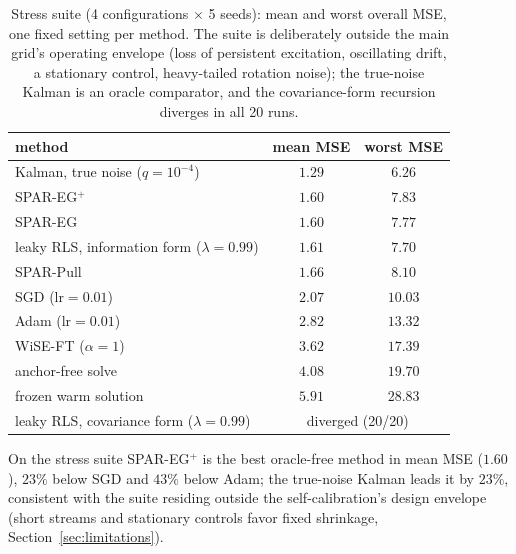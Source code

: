 \documentclass[11pt]{article}
\begin{document}
\begin{table}[htbp]
\centering
\small
\caption{Stress suite (4 configurations $\times$ 5 seeds): mean and worst overall MSE, one fixed setting per method. The suite is deliberately outside the main grid's operating envelope (loss of persistent excitation, oscillating drift, a stationary control, heavy-tailed rotation noise); the true-noise Kalman is an oracle comparator, and the covariance-form recursion diverges in all 20 runs.}
\label{tab:stress}
\begin{tabular}{lcc}
\toprule
method & mean MSE & worst MSE \\
\midrule
Kalman, true noise ($q = 10^{-4}$) & $1.29$ & $6.26$ \\
SPAR-EG$^+$ & $1.60$ & $7.83$ \\
SPAR-EG & $1.60$ & $7.77$ \\
leaky RLS, information form ($\lambda = 0.99$) & $1.61$ & $7.70$ \\
SPAR-Pull & $1.66$ & $8.10$ \\
SGD ($\mathrm{lr} = 0.01$) & $2.07$ & $10.03$ \\
Adam \citep{kingma2015adam} ($\mathrm{lr} = 0.01$) & $2.82$ & $13.32$ \\
WiSE-FT ($\alpha = 1$) & $3.62$ & $17.39$ \\
anchor-free solve & $4.08$ & $19.70$ \\
frozen warm solution & $5.91$ & $28.83$ \\
leaky RLS, covariance form ($\lambda = 0.99$) & \multicolumn{2}{c}{diverged (20/20)} \\
\bottomrule
\end{tabular}
\end{table}

On the stress suite SPAR-EG$^+$ is the best oracle-free method in mean MSE ($1.60$), $23\%$ below SGD and $43\%$ below Adam; the true-noise Kalman leads it by $23\%$, consistent with the suite residing outside the self-calibration's design envelope (short streams and stationary controls favor fixed shrinkage, Section~\ref{sec:limitations}).
\end{document}

